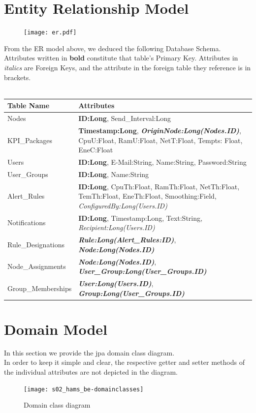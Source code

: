 \documentclass{scrreprt}
\begin{document}
\section{Entity Relationship Model}
\begin{figure}[h!]
	\centering
	\texttt{[image: er.pdf]}
	\label{er}
\end{figure}	

From the ER model above, we deduced the following Database Schema. \\ 
Attributes written in \textbf{bold} constitute that table's Primary Key. Attributes in \emph{italics} are Foreign Keys, and the attribute in the foreign table they reference is in brackets.\\ \\
\begin{tabularx}{12cm}{l|X}
	\hline 
\textbf{Table Name}	& \textbf{Attributes} \\ 
	\hline 
Nodes	&\textbf{ID:Long}, Send\_Interval:Long  \\ 
	\hline 
KPI\_Packages	& \textbf{Timestamp:Long}, \textbf{\emph{OriginNode:Long(Nodes.ID)}}, CpuU:Float, RamU:Float, NetT:Float, Tempts: Float, EneC:Float \\ 
	\hline 
Users	& \textbf{ID:Long}, E-Mail:String, Name:String, Password:String  \\ 
	\hline 
User\_Groups	&\textbf{ID:Long}, Name:String  \\ 
	\hline 
Alert\_Rules	&\textbf{ID:Long}, CpuTh:Float, RamTh:Float, NetTh:Float, TemTh:Float, EneTh:Float, Smoothing:Field, \emph{ConfiguredBy:Long(Users.ID)}  \\ 
	\hline 
Notifications	&\textbf{ID:Long}, Timestamp:Long, Text:String, \emph{Recipient:Long(Users.ID)} \\
\hline 
Rule\_Designations & \textbf{\emph{Rule:Long(Alert\_Rules:ID)}}, \textbf{\emph{Node:Long(Nodes.ID)}}  \\ 
	\hline 
Node\_Assignments	&\textbf{\emph{Node:Long(Nodes.ID)}}, \textbf{\emph{User\_Group:Long(User\_Groups.ID)}}  \\ 
	\hline 
Group\_Memberships	&\textbf{\emph{User:Long(Users.ID)}}, \textbf{\emph{Group:Long(User\_Groups.ID)}}  \\ 
	\hline 
\end{tabularx} 
\section{Domain Model}
In this section we provide the jpa domain class diagram. \\
In order to keep it simple and clear, the respective getter and setter methods of the individual attributes are not depicted in the diagram.
\begin{figure}[h]
	\centering
	\texttt{[image: s02\_hams\_be-domainclasses]}
	\caption{Domain class diagram}
	\label{class_domain}
\end{figure}
\end{document}
